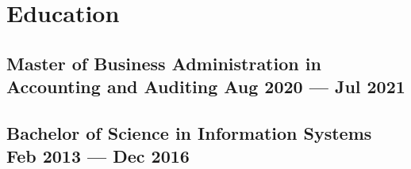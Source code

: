 \section{Education}

\subsection{Master of Business Administration in Accounting and Auditing \hfill Aug 2020 --- Jul 2021}

\vspace{1.2em}

\subsection{Bachelor of Science in Information Systems \hfill Feb 2013 --- Dec 2016}

\vspace{1em}
